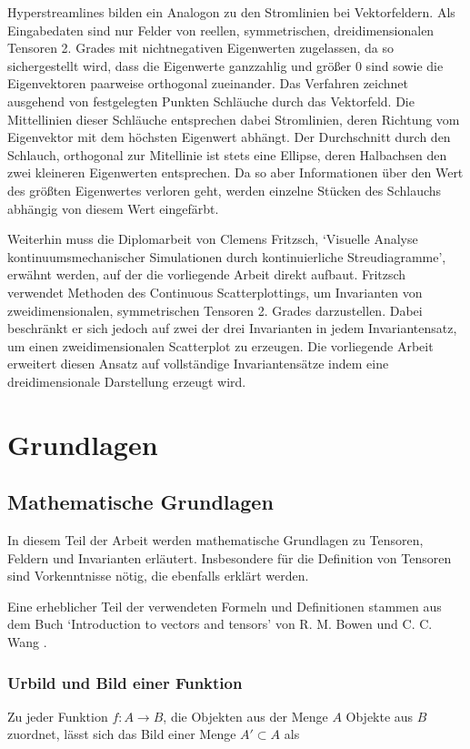 \documentclass[a4paper,fontsize=12pt,toc=bib,halfparskip]{scrartcl}
\begin{document}
Hyperstreamlines\cite{delmarcelle1993visualizing} bilden ein Analogon zu den Stromlinien bei Vektorfeldern. Als Eingabedaten sind nur Felder von reellen, symmetrischen, dreidimensionalen Tensoren 2. Grades mit nichtnegativen Eigenwerten zugelassen, da so sichergestellt wird, dass die Eigenwerte ganzzahlig und gr\"o{\ss}er 0 sind sowie die Eigenvektoren paarweise orthogonal zueinander. Das Verfahren zeichnet ausgehend von festgelegten Punkten Schl\"auche durch das Vektorfeld. Die Mittellinien dieser Schl\"auche entsprechen dabei Stromlinien, deren Richtung vom Eigenvektor mit dem h\"ochsten Eigenwert abh\"angt. Der Durchschnitt durch den Schlauch, orthogonal zur Mitellinie ist stets eine Ellipse, deren Halbachsen den zwei kleineren Eigenwerten entsprechen. Da so aber Informationen \"uber den Wert des gr\"o{\ss}ten Eigenwertes verloren geht, werden einzelne St\"ucken des Schlauchs abh\"angig von diesem Wert eingef\"arbt.

Weiterhin muss die Diplomarbeit von Clemens Fritzsch, `Visuelle Analyse kontinuumsmechanischer Simulationen durch kontinuierliche Streudiagramme'\cite{fritzsch2016contiuousScatterplot}, erw\"ahnt werden, auf der die vorliegende Arbeit direkt aufbaut. Fritzsch verwendet Methoden des Continuous Scatterplottings, um Invarianten von zweidimensionalen, symmetrischen Tensoren 2. Grades darzustellen. Dabei beschr\"ankt er sich jedoch auf zwei der drei Invarianten in jedem Invariantensatz, um einen zweidimensionalen Scatterplot zu erzeugen. Die vorliegende Arbeit erweitert diesen Ansatz auf vollst\"andige Invariantens\"atze indem eine dreidimensionale Darstellung erzeugt wird.

\section{Grundlagen}
\label{sec:Grundlagen}
\subsection{Mathematische Grundlagen}
In diesem Teil der Arbeit werden mathematische Grundlagen zu Tensoren, Feldern und Invarianten erl\"autert. Insbesondere f\"ur die Definition von Tensoren sind Vorkenntnisse n\"otig, die ebenfalls erkl\"art werden. 

Eine erheblicher Teil der verwendeten Formeln und Definitionen stammen aus dem Buch `Introduction to vectors and tensors' von R. M. Bowen und C. C. Wang \cite{bowen2008introduction}.

\subsubsection{Urbild und Bild einer Funktion}
Zu jeder Funktion $f: A \rightarrow B$, die Objekten aus der Menge $A$ Objekte aus $B$ zuordnet, l\"asst sich das Bild einer Menge $A' \subset A$ als
\end{document}
